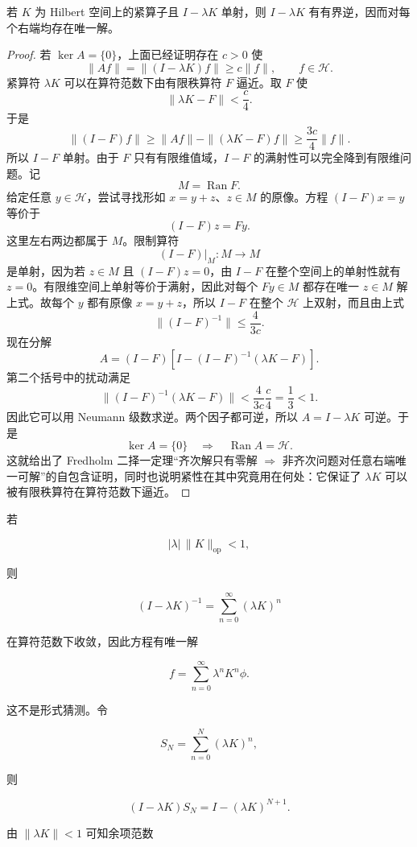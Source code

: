 \begin{proposition}
若 $K$ 为 Hilbert 空间上的紧算子且 $I-\lambda K$ 单射，则 $I-\lambda K$ 有有界逆，因而对每个右端均存在唯一解。
\end{proposition}
\begin{proof}
若 $\ker A=\{0\}$，上面已经证明存在 $c>0$ 使
\[
\|Af\|=\|(I-\lambda K)f\|\ge c\|f\|,
\qquad f\in\mathcal H.
\]
紧算符 $\lambda K$ 可以在算符范数下由有限秩算符 $F$ 逼近。取 $F$ 使
\[
\|\lambda K-F\|<\frac c4.
\]
于是
\[
\|(I-F)f\|
\ge \|Af\|-\|(\lambda K-F)f\|
\ge\frac{3c}{4}\|f\|.
\]
所以 $I-F$ 单射。由于 $F$ 只有有限维值域，$I-F$ 的满射性可以完全降到有限维问题。记
\[
M=\operatorname{Ran}F.
\]
给定任意 $y\in\mathcal H$，尝试寻找形如 $x=y+z$、$z\in M$ 的原像。方程 $ (I-F)x=y$ 等价于
\[
(I-F)z=Fy.
\]
这里左右两边都属于 $M$。限制算符
\[
(I-F)|_M:M\to M
\]
是单射，因为若 $z\in M$ 且 $(I-F)z=0$，由 $I-F$ 在整个空间上的单射性就有 $z=0$。有限维空间上单射等价于满射，因此对每个 $Fy\in M$ 都存在唯一 $z\in M$ 解上式。故每个 $y$ 都有原像 $x=y+z$，所以 $I-F$ 在整个 $\mathcal H$ 上双射，而且由上式
\[
\|(I-F)^{-1}\|\le\frac{4}{3c}.
\]
现在分解
\[
A
=(I-F)\left[I-(I-F)^{-1}(\lambda K-F)\right].
\]
第二个括号中的扰动满足
\[
\|(I-F)^{-1}(\lambda K-F)\|
<\frac{4}{3c}\frac c4
=\frac13<1.
\]
因此它可以用 Neumann 级数求逆。两个因子都可逆，所以 $A=I-\lambda K$ 可逆。于是
\[
\ker A=\{0\}
\quad\Longrightarrow\quad
\operatorname{Ran}A=\mathcal H.
\]
这就给出了 Fredholm 二择一定理“齐次解只有零解 $\Rightarrow$ 非齐次问题对任意右端唯一可解”的自包含证明，同时也说明紧性在其中究竟用在何处：它保证了 $\lambda K$ 可以被有限秩算符在算符范数下逼近。
\end{proof}



若

\[
|\lambda|\,\|K\|_{\mathrm{op}}<1,
\]

则

\[
(I-\lambda K)^{-1}
=\sum_{n=0}^{\infty}(\lambda K)^n
\]

在算符范数下收敛，因此方程有唯一解

\begin{equation*}\boxed{f=\sum_{n=0}^{\infty}\lambda^nK^n\phi}.\end{equation*}

这不是形式猜测。令

\[
S_N=\sum_{n=0}^N(\lambda K)^n,
\]

则

\[
(I-\lambda K)S_N=I-(\lambda K)^{N+1}.
\]

由 $\|\lambda K\|<1$ 可知余项范数

